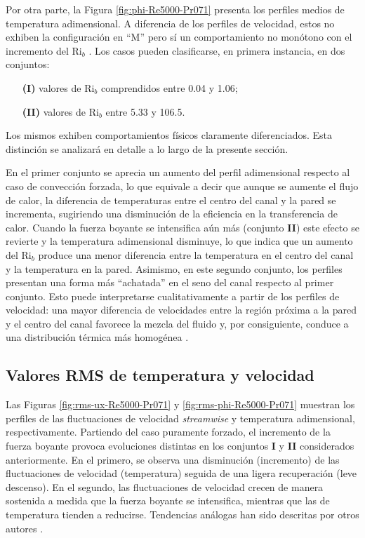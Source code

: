 Por otra parte, la Figura \ref{fig:phi-Re5000-Pr071} presenta los perfiles medios de temperatura adimensional. A diferencia de los perfiles de velocidad, estos no exhiben la configuración en ``M'' pero sí un comportamiento no monótono con el incremento del Ri$_b$ \cite{you2003direct, steiner1971reverse}. Los casos pueden clasificarse, en primera instancia, en dos conjuntos:

\begin{itemize}

\item[\textbf{(I)}] valores de Ri$_b$ comprendidos entre 0.04 y 1.06;

\item[\textbf{(II)}] valores de Ri$_b$ entre 5.33 y 106.5.

\end{itemize}
Los mismos exhiben comportamientos físicos claramente diferenciados. Esta distinción se analizará en detalle a lo largo de la presente sección.

En el primer conjunto se aprecia un aumento del perfil adimensional respecto al caso de convección forzada, lo que equivale a decir que aunque se aumente el flujo de calor, la diferencia de temperaturas entre el centro del canal y la pared se incrementa, sugiriendo una disminución de la eficiencia en la transferencia de calor. Cuando la fuerza boyante se intensifica aún más (conjunto \textbf{II}) este efecto se revierte y la temperatura adimensional disminuye, lo que indica que un aumento del Ri$_b$ produce una menor diferencia entre la temperatura en el centro del canal y la temperatura en la pared. Asimismo, en este segundo conjunto, los perfiles presentan una forma más ``achatada'' en el seno del canal respecto al primer conjunto. Esto puede interpretarse cualitativamente a partir de los perfiles de velocidad: una mayor diferencia de velocidades entre la región próxima a la pared y el centro del canal favorece la mezcla del fluido y, por consiguiente, conduce a una distribución térmica más homogénea \cite{aicher1997}.

\newpage
\subsection{Valores RMS de temperatura y velocidad} 

Las Figuras \ref{fig:rms-ux-Re5000-Pr071} y \ref{fig:rms-phi-Re5000-Pr071} muestran los perfiles de las fluctuaciones de velocidad \textit{streamwise} y temperatura adimensional, respectivamente. Partiendo del caso puramente forzado, el incremento de la fuerza boyante provoca evoluciones distintas en los conjuntos \textbf{I} y \textbf{II} considerados anteriormente. En el primero, se observa una disminución (incremento) de las fluctuaciones de velocidad (temperatura) seguida de una ligera recuperación (leve descenso). En el segundo, las fluctuaciones de velocidad crecen de manera sostenida a medida que la fuerza boyante se intensifica, mientras que las de temperatura tienden a reducirse. Tendencias análogas han sido descritas por otros autores \cite{you2003direct,carr1973velocity}.

